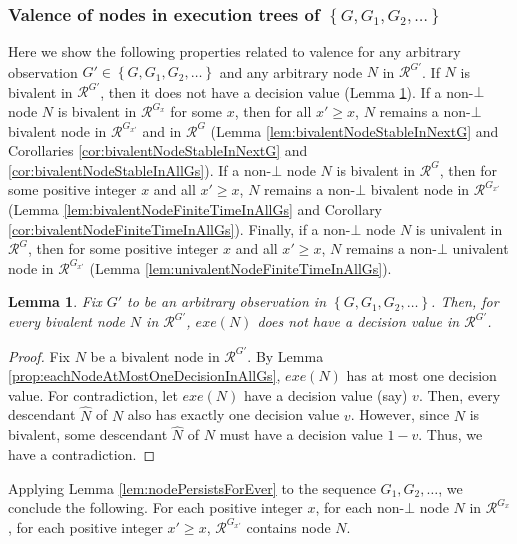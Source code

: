 \documentclass[11pt]{article}
\numberwithin{theorem}{section}
\newtheorem{lemma}[theorem]{Lemma}
\newcommand{\set}[1]{\left\{#1\right\}}
\begin{document}
\subsubsection{Valence of nodes in execution trees of $\set{G,G_1,G_2,\ldots}$}
Here we show the following properties related to valence for any arbitrary observation $G' \in \set{G, G_1, G_2, \ldots }$ and any arbitrary node $N$ in $\mathcal{R}^{G'}$. If $N$ is bivalent in $\mathcal{R}^{G'}$, then it does not have a decision value (Lemma \ref{prop:bivalentNoDecisionValue}). If a non-$\bot$ node $N$ is bivalent in $\mathcal{R}^{G_x}$ for some $x$, then for all $x' \geq x$, $N$ remains a non-$\bot$ bivalent node in $\mathcal{R}^{G_{x'}}$ and in $\mathcal{R}^{G}$ (Lemma \ref{lem:bivalentNodeStableInNextG} and Corollaries  \ref{cor:bivalentNodeStableInNextG} and \ref{cor:bivalentNodeStableInAllGs}). If a non-$\bot$ node $N$ is bivalent in $\mathcal{R}^G$, then for some positive integer $x$ and all $x' \geq x$, $N$ remains a non-$\bot$ bivalent node in $\mathcal{R}^{G_{x'}}$ (Lemma \ref{lem:bivalentNodeFiniteTimeInAllGs} and Corollary \ref{cor:bivalentNodeFiniteTimeInAllGs}). Finally, if a non-$\bot$ node $N$ is univalent in $\mathcal{R}^G$, then for some positive integer $x$ and all $x' \geq x$, $N$ remains a non-$\bot$ univalent node in $\mathcal{R}^{G_{x'}}$ (Lemma \ref{lem:univalentNodeFiniteTimeInAllGs}).



\begin{lemma}\label{prop:bivalentNoDecisionValue}
 Fix $G'$ to be an arbitrary observation in $\set{G, G_1, G_2, \ldots }$. Then, for every bivalent node $N$ in $\mathcal{R}^{G'}$, $exe(N)$ does not have a decision value in $\mathcal{R}^{G'}$.
\end{lemma}
\begin{proof}
Fix $N$ be a bivalent node in $\mathcal{R}^{G'}$. By Lemma
\ref{prop:eachNodeAtMostOneDecisionInAllGs}, $exe(N)$ has at most one
decision value. For contradiction, let $exe(N)$ have a decision value
(say) $v$. Then, every descendant $\hat{N}$ of $N$ also has exactly one decision
value $v$. However, since $N$ is bivalent, some descendant $\hat{N}$ of $N$ must
have a decision value $1-v$. Thus, we have a contradiction.
\end{proof}

Applying Lemma \ref{lem:nodePersistsForEver} to the sequence $G_1,G_2,\ldots$, we conclude the following. For each positive integer $x$, for each non-$\bot$ node $N$ in $\mathcal{R}^{G_x}$, for each positive integer $x'\geq x$, $\mathcal{R}^{G_{x'}}$ contains node $N$.
\end{document}
